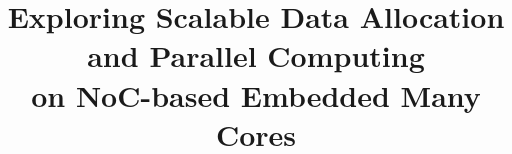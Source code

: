 \documentclass[conference,compsoc]{IEEEtran}
\author{
}
\title{\comment{1-2, 3-2}Exploring Scalable Data Allocation and Parallel Computing \\ on NoC-based Embedded Many Cores}
\newcommand{\comment}[1]{}
\begin{document}

\maketitle

\setcounter{topnumber}{5}%
\def\topfraction{1.00}%
\setcounter{bottomnumber}{5}%
\def\bottomfraction{1.00}%
\setcounter{totalnumber}{10}%
\def\textfraction{0.00}%


\comment{TBD:1-1, 1-14, 2-2, 3-5}
\end{document}
